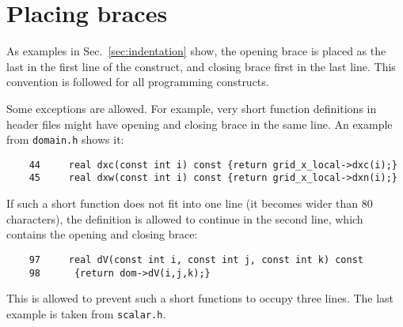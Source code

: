 \section{Placing braces}
\label{sec:placing-braces}

As examples in Sec.~\ref{sec:indentation} show, the opening brace is placed 
as the last in the first line of the construct, and closing brace first in
the last line. This convention is followed for all programming constructs.

Some exceptions are allowed. For example, very short function definitions
in header files might have opening and closing brace in the same line.
An example from {\tt domain.h} shows it:
%
{\small \begin{verbatim}
    44     real dxc(const int i) const {return grid_x_local->dxc(i);}
    45     real dxw(const int i) const {return grid_x_local->dxn(i);}
\end{verbatim}}
% 
If such a short function does not fit into one line (it becomes wider 
than 80 characters), the definition is allowed to continue in the second
line, which contains the opening and closing brace:
%
{\small \begin{verbatim}
    97     real dV(const int i, const int j, const int k) const
    98      {return dom->dV(i,j,k);}
\end{verbatim}}
% 
This is allowed to prevent such a short functions to occupy three lines.
The last example is taken from {\tt scalar.h}.

\vspace*{5mm}  %

